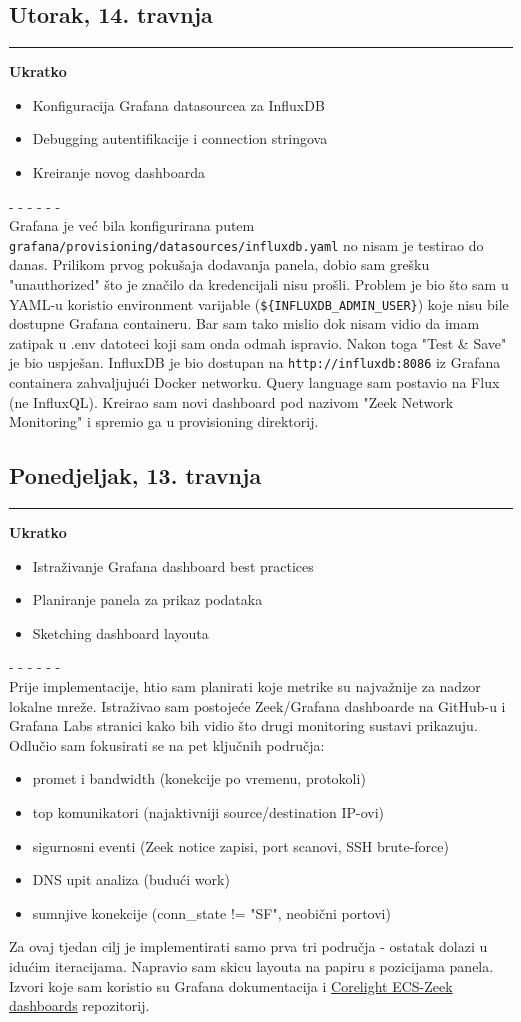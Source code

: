 \documentclass[12pt, a4paper]{article}
\newcommand{\dan}[1]{
    \subsection*{#1}
    \vspace{-0.5em} 
    \hrule \vspace{0.5em} 
}
\begin{document}
\dan{Utorak, 14. travnja}
\textbf{Ukratko}
\begin{itemize}
    \item Konfiguracija Grafana datasourcea za InfluxDB
    \item Debugging autentifikacije i connection stringova
    \item Kreiranje novog dashboarda
\end{itemize}
- - - - - - \\
Grafana je već bila konfigurirana putem \lstinline|grafana/provisioning/datasources/influxdb.yaml| no nisam je 
testirao do danas. Prilikom prvog pokušaja dodavanja panela, dobio sam grešku "unauthorized" što je značilo da 
kredencijali nisu prošli. Problem je bio što sam u YAML-u koristio environment varijable 
(\lstinline|${INFLUXDB_ADMIN_USER}|) koje nisu bile dostupne Grafana containeru. 
Bar sam tako mislio dok nisam vidio da imam zatipak u .env datoteci koji sam onda odmah ispravio.
Nakon toga "Test \& Save" je bio uspješan. InfluxDB je bio dostupan na \lstinline|http://influxdb:8086| iz Grafana containera zahvaljujući 
Docker networku. Query language sam postavio na Flux (ne InfluxQL). Kreirao sam novi dashboard pod nazivom "Zeek Network Monitoring" i 
spremio ga u provisioning direktorij.

\dan{Ponedjeljak, 13. travnja}
\textbf{Ukratko}
\begin{itemize}
    \item Istraživanje Grafana dashboard best practices
    \item Planiranje panela za prikaz podataka
    \item Sketching dashboard layouta
\end{itemize}
- - - - - - \\
Prije implementacije, htio sam planirati koje metrike su najvažnije za nadzor lokalne mreže. Istraživao sam 
postojeće Zeek/Grafana dashboarde na GitHub-u i Grafana Labs stranici kako bih vidio što drugi monitoring 
sustavi prikazuju. Odlučio sam fokusirati se na pet  ključnih područja: 
\begin{itemize}
    \item promet i bandwidth (konekcije po vremenu, protokoli)
    \item top komunikatori (najaktivniji source/destination IP-ovi)
    \item sigurnosni eventi (Zeek notice zapisi, port scanovi, SSH brute-force)
    \item DNS upit analiza (budući work)
    \item sumnjive konekcije (conn\_state != "SF", neobični portovi)
\end{itemize}
Za ovaj tjedan cilj je implementirati samo prva tri područja - ostatak dolazi u idućim iteracijama. 
Napravio sam skicu layouta na papiru s pozicijama panela. Izvori koje sam koristio su Grafana dokumentacija i 
\href{https://github.com/corelight/ecs-zeek-dashboards}{Corelight ECS-Zeek dashboards} repozitorij.
\end{document}
